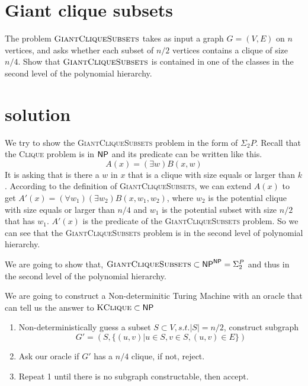 

\maketitle
\thispagestyle{firststyle}
\vspace{-2.0cm}

\section{Giant clique subsets}
    The problem $\textsc{GiantCliqueSubsets}$ takes as input a graph $G = (V,E)$ on $n$ vertices, and asks whether each subset of $n/2$ vertices contains a clique of size $n/4$. Show that $\textsc{GiantCliqueSubsets}$ is contained in one of the classes in the second level of the polynomial hierarchy.
 
\section*{solution}
We try to show the \textsc{GiantCliqueSubsets} problem in the form of $\Sigma_2P$. 
Recall that the \textsc{Clique} problem is in $\mathsf{NP}$ and its predicate can be written like this.
$$A(x) = (\exists w)B(x, w)$$
It is asking that is there a $w$ in $x$ that is a clique with size equals or larger than $k$. 
According to the definition of \textsc{GiantCliqueSubsets}, we can extend $A(x)$ to get $A'(x) = (\forall w_1)(\exists w_2)B(x, w_1, w_2)$, 
where $w_2$ is the potential clique with size equals or larger than $n/4$ and $w_1$ is the potential 
subset with size $n/2$ that has $w_1$. $A'(x)$ is the predicate of the \textsc{GiantCliqueSubsets} problem. 
So we can see that the \textsc{GiantCliqueSubsets} problem is in the second level of polynomial hierarchy.


We are going to show that, $\textsc{GiantCliqueSubsets} \subset \mathsf{NP}^{\mathsf{NP}} = \Sigma_2^P$ and thus in the second level of the polynomial hierarchy.

We are going to construct a Non-determinitic Turing Machine with an oracle that can tell us the answer to $\textsc{KClique} \subset \mathsf{NP}$

\begin{enumerate}
    \item Non-deterministically guess a subset $S \subset V, s.t. |S| = n/2$, 
    construct subgraph $$G' = (S, \{(u, v) | u \in S, v \in S, (u, v) \in E\})$$
    \item Ask our oracle if $G'$ has a $n/4$ clique, if not, reject.
    \item Repeat 1 until there is no subgraph constructable, then accept.
\end{enumerate}



